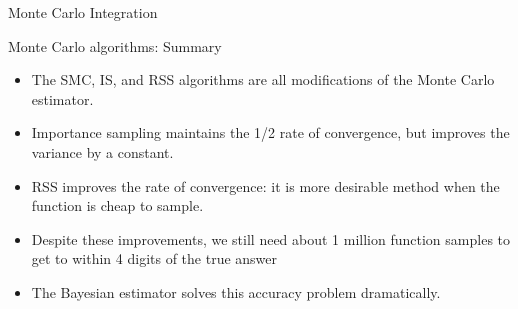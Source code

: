 \documentclass{beamer}
\begin{document}
\begin{section}{Monte Carlo Integration}
\begin{frame}{Monte Carlo algorithms: Summary}
    \begin{itemize}
        \item The SMC, IS, and RSS algorithms are all modifications of the Monte Carlo estimator. 
        \pause
        \item Importance sampling maintains the 1/2 rate of convergence, but improves the variance by a constant.
        \pause
        \item RSS improves the rate of convergence: it is more desirable method when the function is cheap to sample. 
        \pause
        \item Despite these improvements, we still need about 1 million function samples to get to within 4 digits of the true answer
        \pause
        \item The Bayesian estimator solves this accuracy problem dramatically.
    \end{itemize}
\end{frame}
\end{section}
\end{document}
